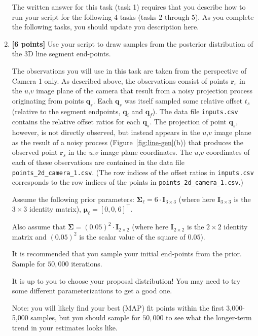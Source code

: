 \documentclass[10pt]{article}
\begin{document}
\begin{enumerate}
The written answer for this task (task 1) requires that you describe how to run your script for the following 4 tasks (tasks 2 through 5). As you complete the following tasks, you should update you description here.

\item {\bf [6 points]} \label{task-b} Use your script to draw samples from the posterior distribution of the 3D line segment end-points. 

The observations you will use in this task are taken from the perspective of Camera 1 only.
As described above, the observations consist of points $\mathbf{r}_s$ in the $u$,$v$ image plane of the camera that result from a noisy projection process originating from points $\mathbf{q}_s$. %
Each $\mathbf{q}_s$ was itself sampled some relative offset $t_s$ (relative to the segment endpoints, $\mathbf{q}_i$ and $\mathbf{q}_f$). The data file {\tt inputs.csv} contains the relative offset ratios for each $\mathbf{q}_s$. 
The projection of point $\mathbf{q}_s$, however, is not directly observed, but instead appears in the $u$,$v$ image plane as the result of a noisy process (Figure~\ref{fig:line-gen}(b)) that produces the observed point $\mathbf{r}_s$ in the $u$,$v$ image plane coordinates. The $u$,$v$ coordinates of each of these observations are contained in the data file {\tt points\_2d\_camera\_1.csv}. (The row indices of the offset ratios in {\tt inputs.csv} corresponds to the row indices of the points in {\tt points\_2d\_camera\_1.csv}.)

Assume the following prior parameters: $\boldsymbol{\Sigma}_{\boldsymbol{\ell}} = 6 \cdot \mathbf{I}_{3 \times 3}$ (where here $\mathbf{I}_{3 \times 3}$ is the $3 \times 3$ identity matrix), $\boldsymbol{\mu}_{\boldsymbol{\ell}} = [0,0,6]^{\top}$.

Also assume that $\boldsymbol{\Sigma} = (0.05)^2 \cdot \mathbf{I}_{2 \times 2}$ (where here $\mathbf{I}_{2 \times 2}$ is the $2 \times 2$ identity matrix and $(0.05)^2$ is the scalar value of the square of $0.05$).  

It is recommended that you sample your initial end-points from the prior.  Sample for $50,000$ iterations.  

It is up to you to choose your proposal distribution! You may need to try some different parameterizations to get a good one.

Note: you will likely find your best (MAP) fit points within the first 3,000-5,000 samples, but you should sample for $50,000$ to see what the longer-term trend in your estimates looks like.


\end{enumerate}
\end{document}
